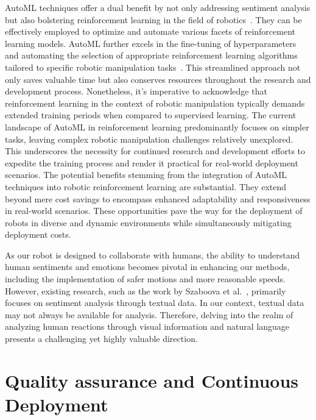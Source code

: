 \documentclass[11pt]{article}
\begin{document}
AutoML techniques offer a dual benefit by not only addressing sentiment analysis but also bolstering reinforcement learning in the field of robotics~\cite{parker2022automated}. They can be effectively employed to optimize and automate various facets of reinforcement learning models. AutoML further excels in the fine-tuning of hyperparameters and automating the selection of appropriate reinforcement learning algorithms tailored to specific robotic manipulation tasks~\cite{he2021automl}. This streamlined approach not only saves valuable time but also conserves resources throughout the research and development process.
Nonetheless, it's imperative to acknowledge that reinforcement learning in the context of robotic manipulation typically demands extended training periods when compared to supervised learning. The current landscape of AutoML in reinforcement learning predominantly focuses on simpler tasks, leaving complex robotic manipulation challenges relatively unexplored. This underscores the necessity for continued research and development efforts to expedite the training process and render it practical for real-world deployment scenarios.
The potential benefits stemming from the integration of AutoML techniques into robotic reinforcement learning are substantial. They extend beyond mere cost savings to encompass enhanced adaptability and responsiveness in real-world scenarios. These opportunities pave the way for the deployment of robots in diverse and dynamic environments while simultaneously mitigating deployment costs.

As our robot is designed to collaborate with humans, the ability to understand human sentiments and emotions becomes pivotal in enhancing our methods, including the implementation of safer motions and more reasonable speeds. However, existing research, such as the work by Szaboova et al.~\cite{szaboova2020emotion}, primarily focuses on sentiment analysis through textual data. In our context, textual data may not always be available for analysis. Therefore, delving into the realm of analyzing human reactions through visual information and natural language presents a challenging yet highly valuable direction.



\section*{Quality assurance and Continuous Deployment}
\end{document}
